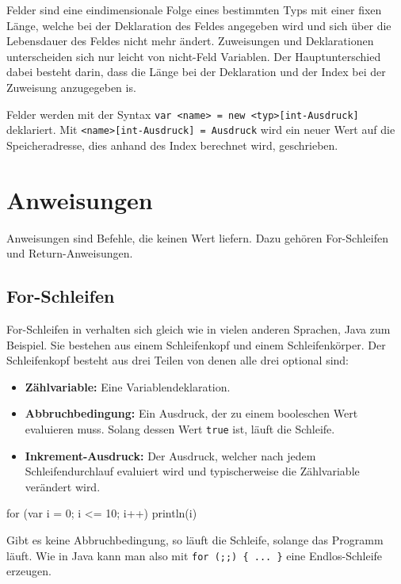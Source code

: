Felder sind eine eindimensionale Folge eines bestimmten Typs mit einer fixen Länge, welche bei der Deklaration des Feldes angegeben wird und sich über die Lebensdauer des Feldes nicht mehr ändert. Zuweisungen und Deklarationen unterscheiden sich nur leicht von nicht-Feld Variablen. Der Hauptunterschied dabei besteht darin, dass die Länge bei der Deklaration und der Index bei der Zuweisung anzugegeben is.

Felder werden mit der Syntax \texttt{var <name> = new <typ>[int-Ausdruck]} deklariert. Mit \texttt{<name>[int-Ausdruck] = Ausdruck} wird ein neuer Wert auf die Speicheradresse, dies anhand des Index berechnet wird, geschrieben.

\section{Anweisungen}

Anweisungen sind Befehle, die keinen Wert liefern. Dazu gehören For-Schleifen und Return-Anweisungen.

\subsection{For-Schleifen}

For-Schleifen in \toya verhalten sich gleich wie in vielen anderen Sprachen, Java zum Beispiel. Sie bestehen aus einem Schleifenkopf und einem Schleifenkörper. Der Schleifenkopf besteht aus drei Teilen von denen alle drei optional sind:
\begin{itemize}
    \item \textbf{Zählvariable:} Eine Variablendeklaration.
    \item \textbf{Abbruchbedingung:} Ein Ausdruck, der zu einem booleschen Wert evaluieren muss. Solang dessen Wert \texttt{true} ist, läuft die Schleife.  
    \item \textbf{Inkrement-Ausdruck:} Der Ausdruck, welcher nach jedem Schleifendurchlauf evaluiert wird und typischerweise die Zählvariable verändert wird.
\end{itemize}

\begin{ToyaCode}[numbers=none, caption={Eine For-Schleife, die die Zählvariable auf die Konsole ausgibt.}]
for (var i = 0; i <= 10; i++) {
    println(i)
}
\end{ToyaCode}

Gibt es keine Abbruchbedingung, so läuft die Schleife, solange das Programm läuft. Wie in Java kann man also mit \texttt{for (;;) \{ ... \}} eine Endlos-Schleife erzeugen.

